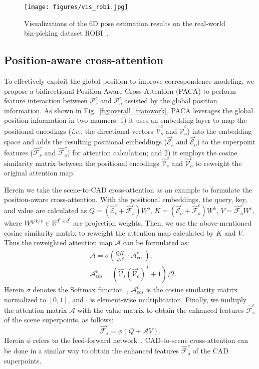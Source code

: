 
\begin{figure*}[!t]
    \centering
    \texttt{[image: figures/vis\_robi.jpg]}
    \caption{Visualizations of the 6D pose estimation results on the real-world bin-picking dataset ROBI~\cite{robi}.
}
    \label{fig:vis_robi}
    \vspace{-5mm}
\end{figure*}


\subsection{Position-aware cross-attention}
To effectively exploit the global position to improve correspondence modeling, we propose a bidirectional Position-Aware Cross-Attention (PACA) to perform feature interaction between $\mathcal{P}_s^c$ and $\mathcal{P}_o^c$ assisted by the global position information.
As shown in Fig.~\ref{fig:overall_framwork}, PACA leverages the global position information in two manners: 1) it uses an embedding layer to map the positional encodings (\emph{i.e.}, the directional vectors $\hat{\mathcal{V}}_s^c$ and $\hat{\mathcal{V}}_o^c$) into the embedding space and adds the resulting positional embeddings ($\hat{\mathcal{E}}_s^c$ and $\hat{\mathcal{E}}_o^c$) to the superpoint features ($\hat{\mathcal{F}}_s^c$ and $\hat{\mathcal{F}}_o^c$) for attention calculation; and 2) it employs the cosine similarity matrix between the positional encodings $\hat{\mathcal{V}}_s^c$ and $\hat{\mathcal{V}}_o^c$ to reweight the original attention map.

Herein we take the scene-to-CAD cross-attention as an example to formulate the position-aware cross-attention. With the positional embeddings, the query, key, and value are calculated as $Q = (\hat{\mathcal{E}}_s^c + \hat{\mathcal{F}}_s^c)W^q$, $K = (\hat{\mathcal{E}}_o^c + \hat{\mathcal{F}}_o^c)W^k$, $V = \hat{\mathcal{F}}_o^cW^v$, where $W^{q/k/v} \in \mathbb{R}^{d^c \times d^c}$ are projection weights. Then, we use the above-mentioned cosine similarity matrix to reweight the attention map calculated by $K$ and $V$. Thus the reweighted attention map $\mathcal{A}$ can be formulated as:
\begin{align}
    &\mathcal{A} = \sigma(\frac{Q K^T}{\sqrt{d^c}} \cdot \mathcal{A}^c_{\cos}),\\
    &\mathcal{A}_{\cos}^c = (\hat{\mathcal{V}}_s^c (\hat{\mathcal{V}}_o^{c})^{T} + 1) / 2.
\end{align}
Herein $\sigma$ denotes the Softmax function~\cite{lecun1989backpropagation}, $\mathcal{A}_{\cos}^c$ is the cosine similarity matrix normalized to $[0,1]$, and $\cdot$ is element-wise multiplication.
Finally, we multiply the attention matrix $\mathcal{A}$ with the value matrix to obtain the enhanced features $\hat{\mathcal{F}}_s^c$ of the scene superpoints, as follows:
\begin{equation}
    \hat{\mathcal{F}}_s^c = \phi(Q + \mathcal{A}V).
\end{equation}
Herein $\phi$ refers to the feed-forward network~\cite{lecun2015deep}. CAD-to-scene cross-attention can be done in a similar way to obtain the enhanced features $\hat{\mathcal{F}}_o^c$ of the CAD superpoints.


